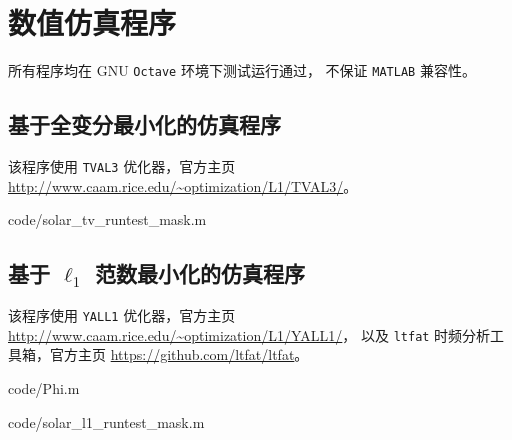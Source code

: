 \chapter{数值仿真程序}

\sloppy

所有程序均在 GNU \verb|Octave| 环境下测试运行通过，
不保证 \verb|MATLAB| 兼容性。

\section{基于全变分最小化的仿真程序}

该程序使用 \verb|TVAL3| 优化器，官方主页
\url{http://www.caam.rice.edu/~optimization/L1/TVAL3/}。

\lstset{basicstyle=\ttfamily}


{code/solar_tv_runtest_mask.m}

\section{基于 $\ell_1$ 范数最小化的仿真程序}

该程序使用 \verb|YALL1| 优化器，官方主页
\url{http://www.caam.rice.edu/~optimization/L1/YALL1/}，
以及 \verb|ltfat| 时频分析工具箱，官方主页
\url{https://github.com/ltfat/ltfat}。


{code/Phi.m}


{code/solar_l1_runtest_mask.m}

\fussy
